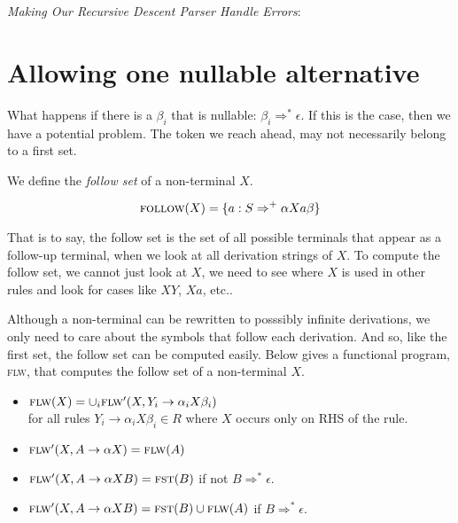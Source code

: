 \frmrule 

\textit{Making Our Recursive Descent Parser Handle Errors}:


\frmrule 




\section{Allowing one nullable alternative}

What happens if there is a $\beta_i$ that is nullable: $\beta_i \Rightarrow^{*} \epsilon$. 
If this is the case, 
then we have a potential problem. The token we reach ahead, 
may not necessarily belong to a first set. 




We define the \textit{follow set} of a non-terminal $X$. 

$$\textsc{follow}(X) = \{a: S \Rightarrow^{+} \alpha X a \beta \}$$

That is to say, the follow set is the set of 
all possible terminals that appear 
as a follow-up terminal, when we look at all derivation strings of $X$.
To compute the follow set, we cannot just look at $X$, we need to see where $X$ is used 
in other rules and look for cases like $XY$, $Xa$, etc.. 

Although a non-terminal can be rewritten to posssibly infinite derivations, 
we only need to care about the symbols that follow each derivation. And so, like the first set, 
the follow set can be computed easily.
Below gives a functional program, \textsc{flw}, that computes the follow set of a non-terminal $X$.

\begin{itemize}
\item $\textsc{flw}(X) = \cup_{i} \textsc{flw}'(X,Y_i \rightarrow \alpha_i X \beta_i)$\\
for all rules $Y_i \rightarrow \alpha_i X \beta_i \in R$ where $X$ occurs only on RHS of the rule.
\item $\textsc{flw}'(X,A \rightarrow \alpha X) = \textsc{flw}(A)$ 
\item $\textsc{flw}'(X,A \rightarrow \alpha X B) = \textsc{fst}(B)$ if not $B \Rightarrow^{*} \epsilon$. 
\item $\textsc{flw}'(X,A \rightarrow \alpha X B) = \textsc{fst}(B) \cup \textsc{flw}(A) $ if $B \Rightarrow^{*} \epsilon$. 
\end{itemize}


